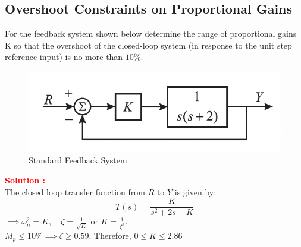 \documentclass[12pt]{article}
\begin{document}
\clearpage
\subsection{Overshoot Constraints on Proportional Gains}
For the feedback system shown below determine the range of proportional gains K so that the overshoot of the closed-loop system (in response to the unit step reference input) is no more than $10\%$. \\

\begin{figure}[h!]
    \centering
    \includegraphics[width=0.8\linewidth]{figs/4.3.png}
    \caption{Standard Feedback System}
    \label{fig:prb36}
\end{figure}
\textbf{\textcolor{red}{Solution :}} \\

\noindent The closed loop transfer function from $R$ to $Y$ is given by:
\[
T(s)=\frac{K}{s^2 + 2s + K}
\]
$\implies \omega_n^2=K, \quad \zeta=\frac{1}{\sqrt{K}} $ or $K=\frac{1}{\zeta^2}$.\\
$M_p \leq 10\% \implies \zeta \geq 0.59$. Therefore, $0 \leq  K \leq 2.86$

\clearpage
\end{document}
